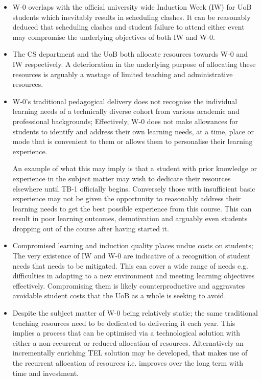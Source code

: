 \begin{itemize}

    \item W-0 overlaps with the official university wide Induction Week (IW) for UoB students which inevitably results in scheduling clashes. It can be reasonably deduced that scheduling clashes and student failure to attend either event may compromise the underlying objectives of both IW and W-0.
    
    \item The CS department and the UoB both allocate resources towards W-0 and IW respectively. A deterioration in the underlying purpose of allocating these resources is arguably a wastage of limited teaching and administrative resources.
    
    \newpage
    
    \item W-0's traditional pedagogical delivery does not recognise the individual learning needs of a technically diverse cohort from various academic and professional backgrounds; Effectively, W-0 does not make allowances for students to identify and address their own learning needs, at a time, place or mode that is convenient to them or allows them to personalise their learning experience.
    
    An example of what this may imply is that a student with prior knowledge or experience in the subject matter may wish to dedicate their resources elsewhere until TB-1 officially begins. Conversely those with insufficient basic experience may not be given the opportunity to reasonably address their learning needs to get the best possible experience from this course. This can result in poor learning outcomes, demotivation and arguably even students dropping out of the course after having started it.
    
    \item Compromised learning and induction quality places undue costs on students; The very existence of IW and W-0 are indicative of a recognition of student needs that needs to be mitigated. This can cover a wide range of needs e.g. difficulties in adapting to a new environment and meeting learning objectives effectively. Compromising them is likely counterproductive and aggravates avoidable student costs that the UoB as a whole is seeking to avoid.
    
    \item Despite the subject matter of W-0 being relatively static; the same traditional teaching resources need to be dedicated to delivering it each year. This implies a process that can be optimised via a technological solution with either a non-recurrent or reduced allocation of resources. Alternatively an incrementally enriching TEL solution may be developed, that makes use of the recurrent allocation of resources i.e. improves over the long term with time and investment.
    
\end{itemize}




